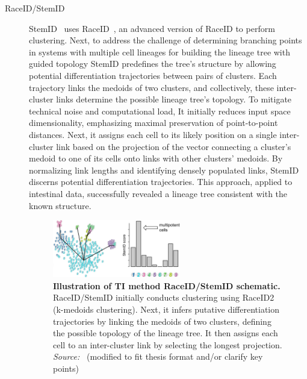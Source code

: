 \begin{description}
  \item[RaceID/StemID]
  StemID~\citep{grun2016stemid} uses RaceID~\citep{grun2015raceid}, an advanced version of RaceID to perform clustering. Next, to address the challenge of determining branching points in systems with multiple cell lineages for building the lineage tree with guided topology StemID predefines the tree's structure by allowing potential differentiation trajectories between pairs of clusters. Each trajectory links the medoids of two clusters, and collectively, these inter-cluster links determine the possible lineage tree's topology. To mitigate technical noise and computational load, It initially reduces input space dimensionality, emphasizing maximal preservation of point-to-point distances. Next, it assigns each cell to its likely position on a single inter-cluster link based on the projection of the vector connecting a cluster's medoid to one of its cells onto links with other clusters' medoids. By normalizing link lengths and identifying densely populated links, StemID discerns potential differentiation trajectories. This approach, applied to intestinal data, successfully revealed a lineage tree consistent with the known structure.
  \begin{figure}[ht!]
  	\centering
  	\includegraphics[width=0.55\textwidth]{TI_Alg_StemID/fig}
  	\vspace{0.1cm}
  	\caption[Illustration of TI method RaceID/StemID schematic.]{\textbf{Illustration of TI method RaceID/StemID schematic.}
  	RaceID/StemID initially conducts clustering using RaceID2 (k-medoids clustering). Next, it infers putative differentiation trajectories by linking the medoids of two clusters, defining the possible topology of the lineage tree. It then assigns each cell to an inter-cluster link by selecting the longest projection. \emph{Source:~\cite{albergante2020ElPiGraph}} (modified to fit thesis format and/or clarify key points)
  	}
  	\label{fig:TI_Alg_StemID}
  \end{figure}



\end{description}
